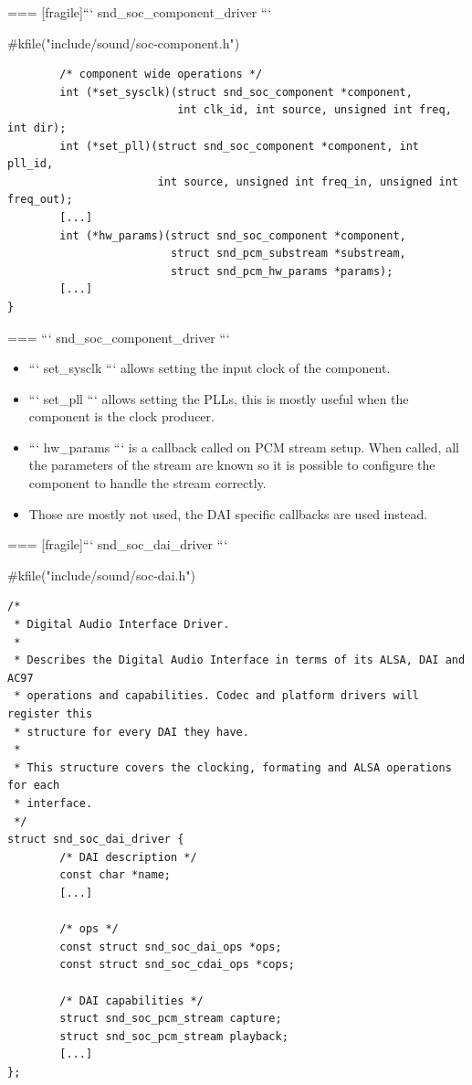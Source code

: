 === [fragile]{``` snd_soc_component_driver ```}
  \begin{block}{#kfile("include/sound/soc-component.h")}
    \fontsize{9}{9}\selectfont
    \begin{verbatim}
        /* component wide operations */
        int (*set_sysclk)(struct snd_soc_component *component,
                          int clk_id, int source, unsigned int freq, int dir);
        int (*set_pll)(struct snd_soc_component *component, int pll_id,
                       int source, unsigned int freq_in, unsigned int freq_out);
        [...]
        int (*hw_params)(struct snd_soc_component *component,
                         struct snd_pcm_substream *substream,
                         struct snd_pcm_hw_params *params);
        [...]
}
    \end{verbatim}
  \end{block}


=== {``` snd_soc_component_driver ```}
  \begin{itemize}
  \item ``` set_sysclk ``` allows setting the input clock of the
    component.
  \item ``` set_pll ``` allows setting the PLLs, this is mostly useful
    when the component is the clock producer.
  \item ``` hw_params ``` is a callback called on PCM stream setup.
    When called, all the parameters of the stream are known so it is
    possible to configure the component to handle the stream
    correctly.
  \item Those are mostly not used, the DAI specific callbacks are used
    instead.
  \end{itemize}


=== [fragile]{``` snd_soc_dai_driver ```}
  \begin{block}{#kfile("include/sound/soc-dai.h")}
    \fontsize{8}{8}\selectfont
    \begin{verbatim}
/*
 * Digital Audio Interface Driver.
 *
 * Describes the Digital Audio Interface in terms of its ALSA, DAI and AC97
 * operations and capabilities. Codec and platform drivers will register this
 * structure for every DAI they have.
 *
 * This structure covers the clocking, formating and ALSA operations for each
 * interface.
 */
struct snd_soc_dai_driver {
        /* DAI description */
        const char *name;
        [...]

        /* ops */
        const struct snd_soc_dai_ops *ops;
        const struct snd_soc_cdai_ops *cops;

        /* DAI capabilities */
        struct snd_soc_pcm_stream capture;
        struct snd_soc_pcm_stream playback;
        [...]
};
    \end{verbatim}
  \end{block}


